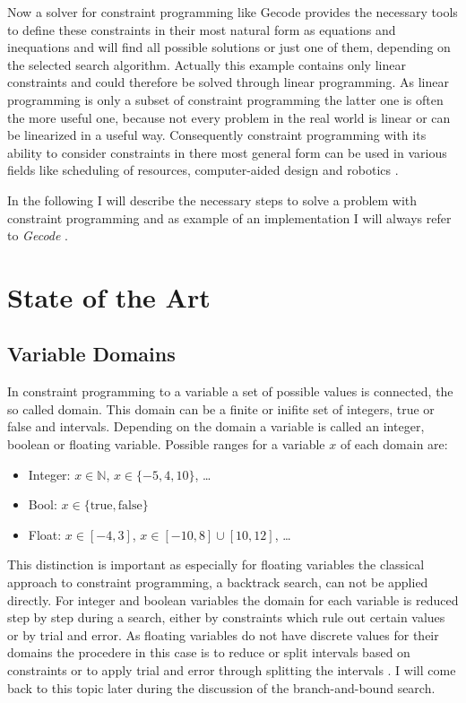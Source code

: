 \documentclass[10pt,
               a4paper,
               journal,
               ]{IEEEtran}
\begin{document}
	Now a solver for constraint programming like Gecode provides the necessary tools to define these constraints in their most natural form as equations and inequations and will find all possible solutions or just one of them, depending on the selected search algorithm. Actually this example contains only linear constraints and could therefore be solved through linear programming. As linear programming is only a subset of constraint programming the latter one is often the more useful one, because not every problem in the real world is linear or can be linearized in a useful way. Consequently constraint programming with its ability to consider constraints in there most general form can be used in various fields like scheduling of resources, computer-aided design and robotics \cite[p.~221]{trendsInCP}.
	
	In the following I will describe the necessary steps to solve a problem with constraint programming and as example of an implementation I will always refer to \emph{Gecode} \cite{gecode}.
	
	\section{State of the Art}
	\subsection{Variable Domains}
	In constraint programming to a variable a set of possible values is connected, the so called domain. This domain can be a finite or inifite set of integers, true or false and intervals. Depending on the domain a variable is called an integer, boolean or floating variable. Possible ranges for a variable $x$ of each domain are:
	\begin{itemize}
		\item Integer: $x \in \mathbb{N}$, $x \in \{-5, 4, 10\}$, \dots
		\item Bool: $x \in \{\text{true}, \text{false}\}$
		\item Float: $x \in [-4, 3]$, $x \in [-10, 8] \cup [10, 12]$, \dots
	\end{itemize}
	This distinction is important as especially for floating variables the classical approach to constraint programming, a backtrack search, can not be applied directly. For integer and boolean variables the domain for each variable is reduced step by step during a search, either by constraints which rule out certain values or by trial and error. As floating variables do not have discrete values for their domains the procedere in this case is to reduce or split intervals based on constraints or to apply trial and error through splitting the intervals \cite[p.~571]{handbookCP}. I will come back to this topic later during the discussion of the branch-and-bound search.
	
\end{document}
